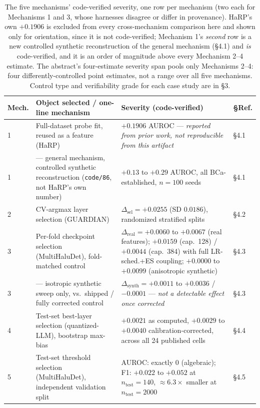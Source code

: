 \documentclass[10pt]{article} %
\begin{document}
\begin{table}[!ht]
\centering
\small
\begin{tabular}{@{}p{}p{}p{}p{}@{}}
\toprule
Mech. & Object selected / one-line mechanism & Severity (code-verified) & §Ref. \\
\midrule
1 & Full-dataset probe fit, reused as a feature (HaRP) & $+0.1906$ AUROC --- \emph{reported from prior work, not reproducible from this artifact} & §4.1 \\
1 & --- general mechanism, controlled synthetic reconstruction (\texttt{code/86}, not HaRP's own number) & $+0.13$ to $+0.29$ AUROC, all BCa-established, $n{=}100$ seeds & §4.1 \\
2 & CV-argmax layer selection (GUARDIAN) & $\Delta_{\text{sel}}=+0.0255$ (SD $0.0186$), randomized stratified splits & §4.2 \\
3 & Per-fold checkpoint selection (MultiHaluDet), fold-matched control & $\Delta_{\text{real}}=+0.0060$ to $+0.0067$ (real features); $+0.0159$ (cap.\ 128) / $+0.0044$ (cap.\ 384) with full LR-sched.+ES coupling; $+0.0000$ to $+0.0099$ (anisotropic synthetic) & §4.3 \\
3 & --- isotropic synthetic sweep only, vs.\ shipped / fully corrected control & $\Delta_{\text{synth}}=+0.0011$ to $+0.0036$ / $-0.0001$ --- \emph{not a detectable effect once corrected} & §4.3 \\
4 & Test-set best-layer selection (quantized-LLM), bootstrap max-bias & $+0.0021$ as computed, $+0.0029$ to $+0.0040$ calibration-corrected, across all 24 published cells & §4.4 \\
5 & Test-set threshold selection (MultiHaluDet), independent validation split & AUROC: exactly $0$ (algebraic); F1: $+0.022$ to $+0.052$ at $n_{\text{test}}=140$, $\approx6.3\times$ smaller at $n_{\text{test}}=2000$ & §4.5 \\
\bottomrule
\end{tabular}
\caption{The five mechanisms' code-verified severity, one row per mechanism
(two each for Mechanisms 1 and 3, whose harnesses disagree or differ in
provenance). HaRP's own $+0.1906$ is excluded from every cross-mechanism
comparison here and shown only for orientation, since it is not code-verified;
Mechanism 1's \emph{second} row is a new controlled synthetic reconstruction of
the general mechanism (§4.1) and \emph{is} code-verified, and it is an order of
magnitude above every Mechanism 2--4 estimate. The abstract's four-estimate
severity span pools only Mechanisms 2--4: four differently-controlled point
estimates, not a range over all five mechanisms. Control type and
verifiability grade for each case study are in §3.}
\label{tab:severity-summary}
\end{table}
\end{document}

